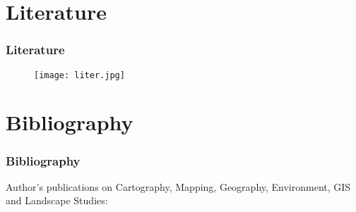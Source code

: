 \documentclass[pdflatex,compress,8pt,
	xcolor={dvipsnames,dvipsnames,svgnames,x11names,table},
	hyperref={	
	breaklinks = true, 
	pdfauthor={Lemenkova Polina}, 
	pdfsubject={Preentation}, 
	pdfcreator={Lemenkova Polina}, 
	pdfproducer={Lemenkova Polina}, 
	colorlinks=true,
	linkcolor=Gold1, 
	citecolor=NavyBlue, 
	urlcolor = NavyBlue, 
	breaklinks = true}]{beamer}
\begin{document}
\section{Literature}
\begin{frame}\frametitle{Literature}
\begin{figure}[H]
	\centering
		\texttt{[image: liter.jpg]}
\end{figure}
\end{frame}

\section{Bibliography}
\begin{frame}[allowframebreaks]\frametitle{Bibliography}
\footnotesize{Author's publications on Cartography, Mapping, Geography, Environment, GIS and Landscape Studies:}
	\nocite{*}
	\printbibliography[heading=none]
\end{frame}


\end{document}
